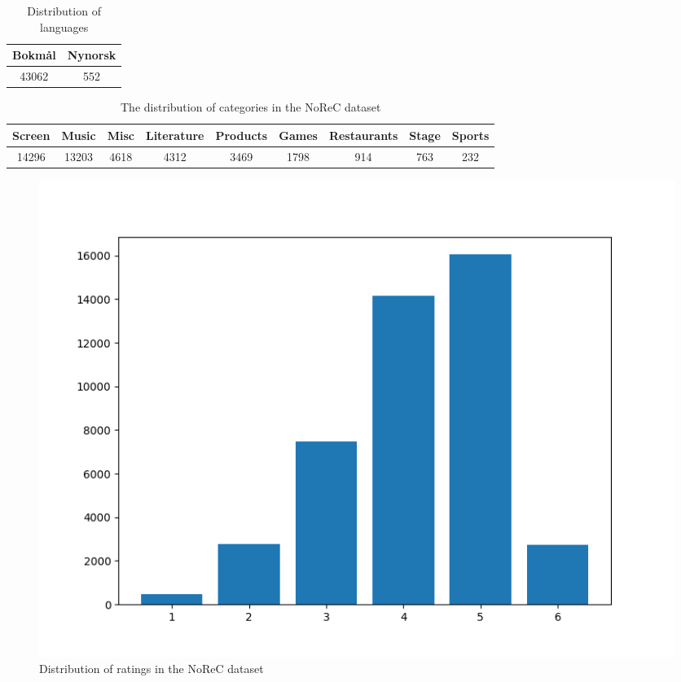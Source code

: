 \begin{table}[]
	\centering
	\begin{tabular}{|l|l|}
		\hline
		Bokmål & Nynorsk \\ \hline
		\multicolumn{1}{|c|}{43062} &  \multicolumn{1}{c|}{552} \\ \hline
	\end{tabular}
	\caption{Distribution of languages}
\end{table}
\begin{table}[]

	\begin{tabular}{|l|l|l|l|l|l|l|l|l|}
		\hline
		Screen & Music & Misc & Literature & Products & Games & Restaurants & Stage & Sports \\ \hline
		\multicolumn{1}{|c|}{14296} &  \multicolumn{1}{c|}{13203} & \multicolumn{1}{c|}{4618} & \multicolumn{1}{c|}{4312} & \multicolumn{1}{c|}{3469} & \multicolumn{1}{c|}{1798} & \multicolumn{1}{c|}{914} & \multicolumn{1}{c|}{763} & \multicolumn{1}{c|}{232}\\ \hline
	\end{tabular}
	\caption{The distribution of categories in the NoReC dataset}
	\label{tab:cat_dist}
\end{table}
\begin{figure}[h!]
	\centering
	\includegraphics[scale=0.5]{img/ratings_new}
	\caption{Distribution of ratings in the NoReC dataset}
	\label{fig:ratings}
\end{figure}%
